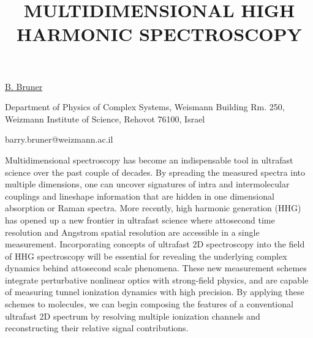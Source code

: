 \title{MULTIDIMENSIONAL HIGH HARMONIC SPECTROSCOPY}

\underline{B. Bruner} 

{\normalsize{\vspace{-4mm}
Department of Physics of Complex Systems,
Weismann Building Rm. 250,
Weizmann Institute of Science,
Rehovot 76100, Israel

\email barry.bruner@weizmann.ac.il}}

Multidimensional spectroscopy has become an indispensable tool in ultrafast science over the past couple of decades.  By spreading the measured spectra into multiple dimensions, one can uncover signatures of intra and intermolecular couplings and lineshape information that are hidden in one dimensional absorption or Raman spectra.  More recently, high harmonic generation (HHG) has opened up a new frontier in ultrafast science where attosecond time resolution and Angstrom spatial resolution are accessible in a single measurement.   Incorporating concepts of ultrafast 2D spectroscopy into the field of HHG spectroscopy will be essential for revealing the underlying complex dynamics behind attosecond scale phenomena.  These new measurement schemes integrate perturbative nonlinear optics with strong-field physics, and are capable of measuring tunnel ionization dynamics with high precision.  By applying these schemes to molecules, we can begin composing the features of a conventional ultrafast 2D spectrum by resolving multiple ionization channels and reconstructing their relative signal contributions. 


\vspace{\baselineskip}
